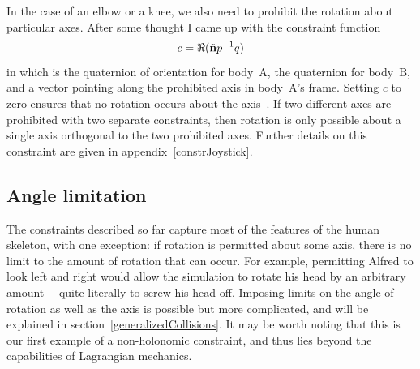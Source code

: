 In the case of an elbow or a knee, we also need to prohibit the rotation about particular axes.
After some thought I came up with the constraint function
\begin{equation}
c = \Re(\tilde{\ve{n}}\q{p}^{-1}\q{q})
\end{equation}
in which  is the quaternion of orientation for body~A,  the quaternion for body~B, and
 a vector pointing along the prohibited axis in body~A's frame. Setting $c$ to zero ensures
that no rotation occurs about the axis~. If two different axes are prohibited with two
separate constraints, then rotation is only possible about a single axis orthogonal to the two
prohibited axes. Further details on this constraint are given in appendix~\ref{constrJoystick}.

\subsection{Angle limitation}

The constraints described so far capture most of the features of the human skeleton, with one
exception: if rotation is permitted about some axis, there is no limit to the amount of rotation
that can occur. For example, permitting Alfred to look left and right would allow the simulation
to rotate his head by an arbitrary amount~-- quite literally to screw his head off. Imposing
limits on the angle of rotation as well as the axis is possible but more complicated, and will
be explained in section~\ref{generalizedCollisions}. It may be worth noting that this is our
first example of a non-holonomic constraint, and thus lies beyond the capabilities of Lagrangian
mechanics.
